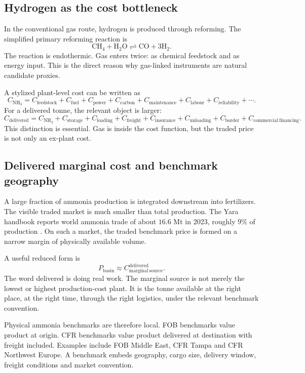 \documentclass[11pt]{article}
\newcommand{\NH}{\mathrm{NH_3}}
\newcommand{\1}{\mathbf 1}
\begin{document}
\subsection{Hydrogen as the cost bottleneck}

In the conventional gas route, hydrogen is produced through reforming. The simplified primary reforming reaction is
\[
\mathrm{CH_4 + H_2O \rightleftharpoons CO + 3H_2}.
\]
The reaction is endothermic. Gas enters twice: as chemical feedstock and as energy input. This is the direct reason why gas-linked instruments are natural candidate proxies.

A stylized plant-level cost can be written as
\[
C_{\NH}
=
C_{\mathrm{feedstock}}
+
C_{\mathrm{fuel}}
+
C_{\mathrm{power}}
+
C_{\mathrm{carbon}}
+
C_{\mathrm{maintenance}}
+
C_{\mathrm{labour}}
+
C_{\mathrm{reliability}}
+
\cdots .
\]
For a delivered tonne, the relevant object is larger:
\[
C_{\mathrm{delivered}}
=
C_{\NH}
+
C_{\mathrm{storage}}
+
C_{\mathrm{loading}}
+
C_{\mathrm{freight}}
+
C_{\mathrm{insurance}}
+
C_{\mathrm{unloading}}
+
C_{\mathrm{border}}
+
C_{\mathrm{commercial\ financing}} .
\]
This distinction is essential. Gas is inside the cost function, but the traded price is not only an ex-plant cost.

\subsection{Delivered marginal cost and benchmark geography}

A large fraction of ammonia production is integrated downstream into fertilizers. The visible traded market is much smaller than total production. The Yara handbook reports world ammonia trade of about \(16.6\) Mt in 2023, roughly \(9\%\) of production \cite{yarahandbook}. On such a market, the traded benchmark price is formed on a narrow margin of physically available volume.

A useful reduced form is
\[
P_{\mathrm{basin}}
\approx
C^{\mathrm{delivered}}_{\mathrm{marginal\ source}} .
\]
The word delivered is doing real work. The marginal source is not merely the lowest or highest production-cost plant. It is the tonne available at the right place, at the right time, through the right logistics, under the relevant benchmark convention.

Physical ammonia benchmarks are therefore local. FOB benchmarks value product at origin. CFR benchmarks value product delivered at destination with freight included. Examples include FOB Middle East, CFR Tampa and CFR Northwest Europe. A benchmark embeds geography, cargo size, delivery window, freight conditions and market convention.
\end{document}
